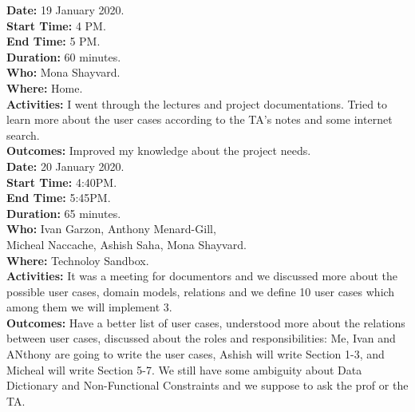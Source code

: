 \documentclass[12pt]{article}
\begin{document}
{\bf Date:} 19 January 2020. \\
{\bf Start Time:} 4 PM. \\
{\bf End Time:} 5 PM. \\
{\bf Duration:} 60 minutes. \\
{\bf Who:} Mona Shayvard. \\
{\bf Where:} Home. \\
{\bf Activities:} I went through the lectures and project documentations. Tried to learn more about the user cases according to the TA's notes and some internet search. \\
{\bf Outcomes:} Improved my knowledge about the project needs. 
\vspace*{0.2in} \\


{\bf Date:} 20 January 2020. \\
{\bf Start Time:} 4:40PM. \\
{\bf End Time:} 5:45PM. \\
{\bf Duration:} 65 minutes. \\
{\bf Who:} Ivan Garzon, Anthony Menard-Gill, \\
\hspace{10mm} Micheal Naccache, Ashish Saha,  Mona Shayvard. \\
{\bf Where:} Technoloy Sandbox. \\
{\bf Activities:} It was a meeting for documentors and we discussed more about the possible user cases, domain models, relations  and we define 10 user cases which among them we will implement 3.   \\
{\bf Outcomes:} Have a better list of user cases, understood more about the relations between user cases, discussed about the roles and responsibilities: Me, Ivan and ANthony are going to write the user cases, Ashish will write Section 1-3, and Micheal will write Section 5-7. We still have some ambiguity about Data Dictionary and  Non-Functional Constraints and we suppose to ask the prof or the TA. \\

\end{document}
